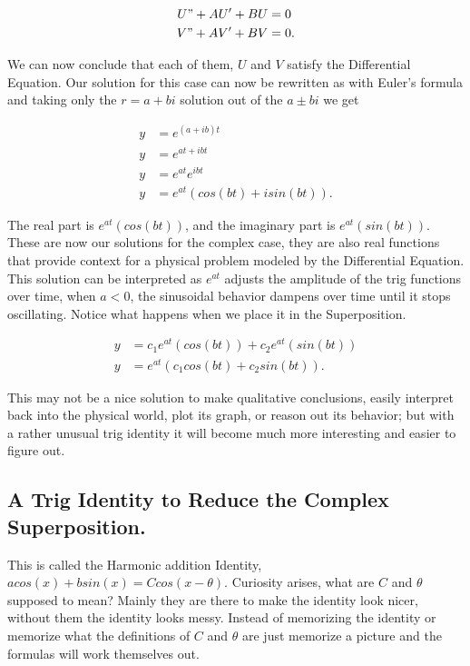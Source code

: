 \documentclass[12pt]{article}
\begin{document}
\begin{align*}
    U"+AU'+BU &= 0 \\
    V"+AV'+BV &= 0.
\end{align*}

We can now conclude that each of them, $U$ and $V$ satisfy the Differential Equation. Our solution for this case can now be rewritten as with Euler's formula and taking only the $r=a+bi$ solution out of the $a \pm bi$ we get

\begin{align*}
    y &= e^{(a+ib)t} \\
    y &= e^{at+ibt} \\
    y &= e^{at}e^{ibt} \\
    y &= e^{at}(cos(bt)+isin(bt)).
\end{align*}

The real part is $e^{at}(cos(bt))$, and the imaginary part is $e^{at}(sin(bt))$. These are now our solutions for the complex case, they are also real functions that provide context for a physical problem modeled by the Differential Equation. This solution can be interpreted as $e^{at}$ adjusts the amplitude of the trig functions over time, when $a<0$, the sinusoidal behavior dampens over time until it stops oscillating. Notice what happens when we place it in the Superposition.

\begin{align*}
    y &= c_1e^{at}(cos(bt))+c_2e^{at}(sin(bt)) \\
    y &= e^{at}(c_1cos(bt)+c_2sin(bt)).
\end{align*}

This may not be a nice solution to make qualitative conclusions, easily interpret back into the physical world, plot its graph, or reason out its behavior; but with a rather unusual trig identity it will become much more interesting and easier to figure out.

\subsection{A Trig Identity to Reduce the Complex Superposition.}

This is called the Harmonic addition Identity, $acos(x)+bsin(x)=Ccos(x-\theta)$. Curiosity arises, what are $C$ and $\theta$ supposed to mean? Mainly they are there to make the identity look nicer, without them the identity looks messy. Instead of memorizing the identity or memorize what the definitions of $C$ and $\theta$ are just memorize a picture and the formulas will work themselves out. \\
\end{document}
